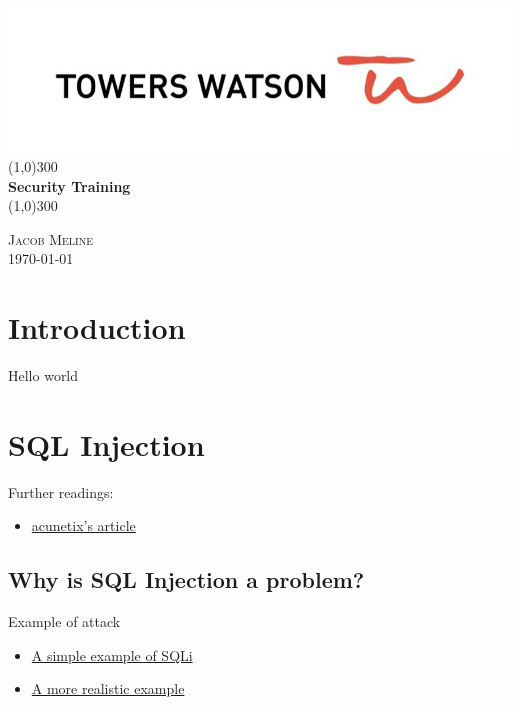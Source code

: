 \documentclass[a4paper, titlepage]{article}
\begin{document}
\begin{titlepage}
    \begin{center}
        \includegraphics[width=0.5\linewidth]{Towers-watson}
        \line(1,0){300} \\
        [0.25in]
        \huge{\bfseries Security Training} \\
        [2mm]
        \line(1,0){300} \\
        [10cm]
    \end{center}
    \begin{flushright}
        \textsc{\large Jacob Meline } \\
        \today
    \end{flushright}
\end{titlepage}

\tableofcontents
\thispagestyle{empty}
\cleardoublepage
\setcounter{page}{1}

\section{Introduction}\label{sec:intro}
\lipsum[1]
Hello world
\newpage

\section{SQL Injection}

Further readings:

\begin{itemize}
    \item \href{https://www.acunetix.com/websitesecurity/sql-injection/}{acunetix's article}
\end{itemize}

\subsection{Why is SQL Injection a problem?}

Example of attack
\begin{itemize}
    \item \href{http://www.w3schools.com/sql/sql_injection.asp}{A simple example of SQLi}
    \item \href{https://www.hackthissite.org/missions/realistic/4/}{A more realistic example}
\end{itemize}
\end{document}
